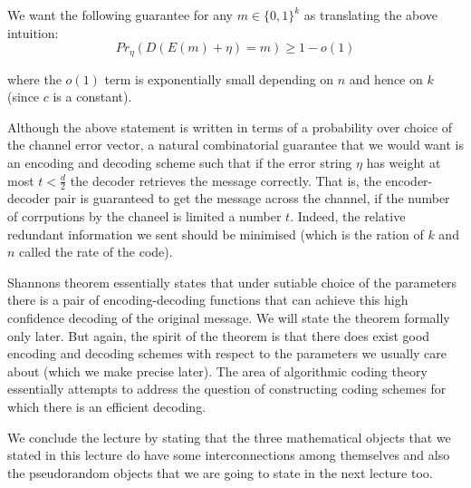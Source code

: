 We want the following guarantee for any $m \in \{0,1\}^k$ as
translating the above intuition:
\[ Pr_{\eta} ( D(E(m)+\eta) = m ) \ge 1-o(1) \]

where the $o(1)$ term is exponentially small depending on $n$ and hence on $k$ (since $c$ is a constant).

Although the above statement is written in terms of a probability over choice of the channel error vector, a natural combinatorial guarantee that we would want is an encoding and decoding scheme such that if the error string $\eta$ has weight at most $t < \frac{d}{2}$ the decoder retrieves the message correctly. That is, the encoder-decoder pair is guaranteed to get the message across the channel, if the number of corrputions by the chaneel is limited a number $t$. Indeed, the relative redundant information we sent should be minimised (which is the ration of $k$ and $n$ called the rate of the code).

Shannons theorem essentially states that under sutiable choice of the parameters there is a pair of
encoding-decoding functions that can achieve this high confidence decoding of the original message. We will state the theorem formally only later. But again, the spirit of the theorem is that there does exist good encoding and decoding schemes with respect to the parameters we usually care about (which we make precise later). The area of algorithmic coding theory essentially attempts to address the question of constructing coding schemes for which there is an efficient decoding.

We conclude the lecture by stating that the three mathematical objects that we stated in this lecture do have some interconnections among themselves and also the pseudorandom objects that we are going to state in the next lecture too.